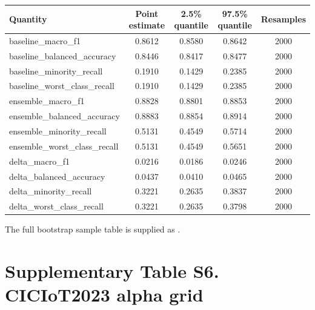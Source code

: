 \documentclass[10pt]{article}
\begin{document}
\begin{center}
\scriptsize
\begin{longtable}{lcccc}
\toprule
Quantity & Point estimate & 2.5\% quantile & 97.5\% quantile & Resamples \\
\midrule
\endhead
baseline\_macro\_f1 & 0.8612 & 0.8580 & 0.8642 & 2000 \\
baseline\_balanced\_accuracy & 0.8446 & 0.8417 & 0.8477 & 2000 \\
baseline\_minority\_recall & 0.1910 & 0.1429 & 0.2385 & 2000 \\
baseline\_worst\_class\_recall & 0.1910 & 0.1429 & 0.2385 & 2000 \\
ensemble\_macro\_f1 & 0.8828 & 0.8801 & 0.8853 & 2000 \\
ensemble\_balanced\_accuracy & 0.8883 & 0.8854 & 0.8914 & 2000 \\
ensemble\_minority\_recall & 0.5131 & 0.4549 & 0.5714 & 2000 \\
ensemble\_worst\_class\_recall & 0.5131 & 0.4549 & 0.5651 & 2000 \\
delta\_macro\_f1 & 0.0216 & 0.0186 & 0.0246 & 2000 \\
delta\_balanced\_accuracy & 0.0437 & 0.0410 & 0.0465 & 2000 \\
delta\_minority\_recall & 0.3221 & 0.2635 & 0.3837 & 2000 \\
delta\_worst\_class\_recall & 0.3221 & 0.2635 & 0.3798 & 2000 \\
\bottomrule
\end{longtable}
\end{center}

The full bootstrap sample table is supplied as .

\section*{Supplementary Table S6. CICIoT2023 alpha grid}
\end{document}
